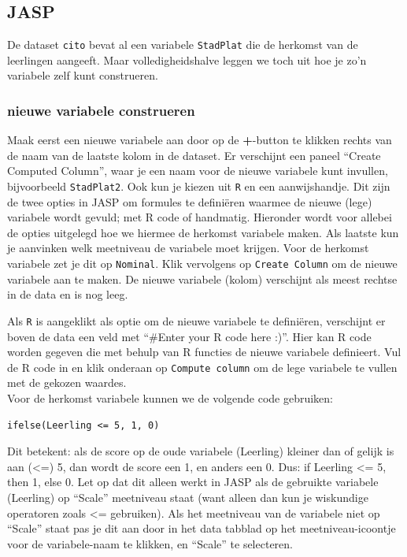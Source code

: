 \documentclass[
]{book}
\begin{document}
\hypertarget{jasp-10}{%
\subsection{JASP}\label{jasp-10}}

De dataset \texttt{cito} bevat al een variabele \texttt{StadPlat} die de herkomst van de leerlingen aangeeft. Maar volledigheidshalve leggen we toch uit hoe je zo'n variabele zelf kunt construeren.

\hypertarget{nieuwe-variabele-construeren-1}{%
\subsubsection{nieuwe variabele construeren}\label{nieuwe-variabele-construeren-1}}

Maak eerst een nieuwe variabele aan door op de \textbf{+}-button te klikken rechts van de naam van de laatste kolom in de dataset. Er verschijnt een paneel ``Create Computed Column'', waar je een naam voor de nieuwe variabele kunt invullen, bijvoorbeeld \texttt{StadPlat2}. Ook kun je kiezen uit \texttt{R} en een aanwijshandje. Dit zijn de twee opties in JASP om formules te definiëren waarmee de nieuwe (lege) variabele wordt gevuld; met R code of handmatig. Hieronder wordt voor allebei de opties uitgelegd hoe we hiermee de herkomst variabele maken. Als laatste kun je aanvinken welk meetniveau de variabele moet krijgen. Voor de herkomst variabele zet je dit op \texttt{Nominal}. Klik vervolgens op \texttt{Create\ Column} om de nieuwe variabele aan te maken. De nieuwe variabele (kolom) verschijnt als meest rechtse in de data en is nog leeg.

Als \texttt{R} is aangeklikt als optie om de nieuwe variabele te definiëren, verschijnt er boven de data een veld met ``\#Enter your R code here :)''. Hier kan R code worden gegeven die met behulp van R functies de nieuwe variabele definieert. Vul de R code in en klik onderaan op \texttt{Compute\ column} om de lege variabele te vullen met de gekozen waardes.\\
Voor de herkomst variabele kunnen we de volgende code gebruiken:

\begin{verbatim}
ifelse(Leerling <= 5, 1, 0) 
\end{verbatim}

Dit betekent: als de score op de oude variabele (Leerling) kleiner dan of gelijk is aan (\textless=) 5, dan wordt de score een 1, en anders een 0. Dus: if Leerling \textless= 5, then 1, else 0. Let op dat dit alleen werkt in JASP als de gebruikte variabele (Leerling) op ``Scale'' meetniveau staat (want alleen dan kun je wiskundige operatoren zoals \textless= gebruiken). Als het meetniveau van de variabele niet op ``Scale'' staat pas je dit aan door in het data tabblad op het meetniveau-icoontje voor de variabele-naam te klikken, en ``Scale'' te selecteren.
\end{document}
